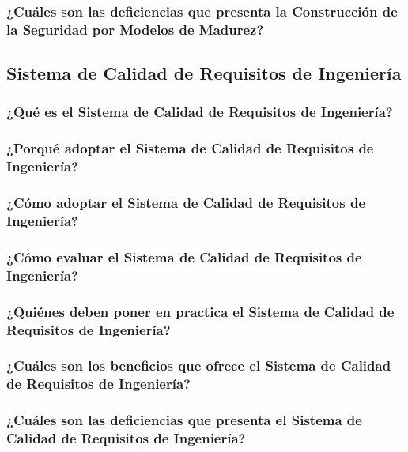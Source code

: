 \documentclass[runningheads,a4paper]{llncs}
\begin{document}
\subsubsection{¿Cuáles son las deficiencias que presenta la Construcción de la Seguridad por Modelos de Madurez?}


\subsection{Sistema de Calidad de Requisitos de Ingeniería}

\subsubsection{¿Qué es el Sistema de Calidad de Requisitos de Ingeniería?}

\subsubsection{¿Porqué adoptar el Sistema de Calidad de Requisitos de Ingeniería?}

\subsubsection{¿Cómo adoptar el Sistema de Calidad de Requisitos de Ingeniería?}

\subsubsection{¿Cómo evaluar el Sistema de Calidad de Requisitos de Ingeniería?}

\subsubsection{¿Quiénes deben poner en practica el Sistema de Calidad de Requisitos de Ingeniería?}

\subsubsection{¿Cuáles son los beneficios que ofrece el Sistema de Calidad de Requisitos de Ingeniería?}

\subsubsection{¿Cuáles son las deficiencias que presenta el Sistema de Calidad de Requisitos de Ingeniería?}



\printnoidxglossaries     
         


\end{document}
